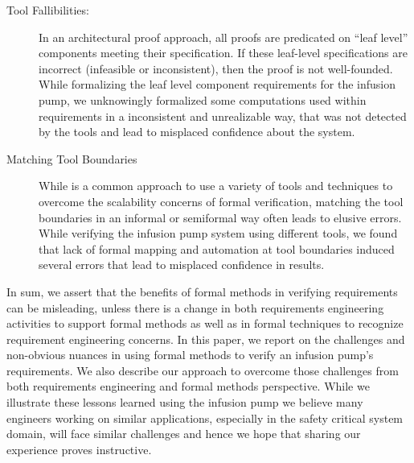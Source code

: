 \begin{description}
    \item[Tool Fallibilities:] In an architectural proof approach, all proofs are predicated on ``leaf level'' components meeting their specification.  If these leaf-level specifications are incorrect (infeasible or inconsistent), then the proof is not well-founded. While formalizing the leaf level component requirements for the infusion pump, we unknowingly formalized some computations used within requirements in a inconsistent and unrealizable way, that was not detected by the tools and lead to misplaced confidence about the system. %
    \item[Matching Tool Boundaries] While is a common approach to use a variety of tools and techniques to overcome the scalability concerns of formal verification, matching the tool boundaries in an informal or semiformal way often leads to elusive errors. While verifying the infusion pump system using different tools, we found that lack of formal mapping and automation at tool boundaries induced several errors that lead to misplaced confidence in results. %
\end{description}

In sum, we assert that the benefits of formal methods in verifying requirements can be misleading, unless there is a change in both requirements engineering activities to support formal methods as well as in formal techniques to recognize requirement engineering concerns. In this paper, we report on the challenges and non-obvious nuances in using formal methods to verify an infusion pump's requirements. We also describe our approach to overcome those challenges from both requirements engineering and formal methods perspective. While we illustrate these lessons learned using the infusion pump we believe many engineers working on similar applications, especially in the safety critical system domain, will face similar challenges and hence we hope that sharing our experience proves instructive. %

